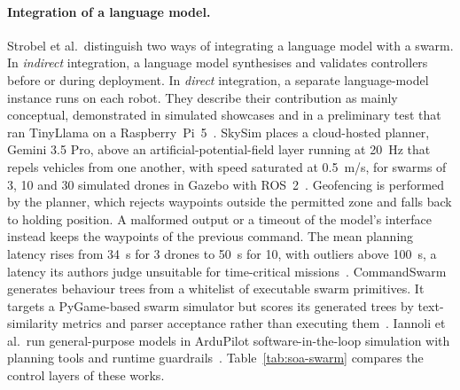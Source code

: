 \paragraph{Integration of a language model.} Strobel et al.\ distinguish two ways of integrating a
language model with a swarm. In \emph{indirect} integration, a language model synthesises and
validates controllers before or during deployment. In \emph{direct} integration, a separate
language-model instance runs on each robot. They describe their contribution as mainly conceptual,
demonstrated in simulated showcases and in a preliminary test that ran TinyLlama on a
Raspberry~Pi~5~\cite{llm2swarm2024}. SkySim places a cloud-hosted planner, Gemini 3.5 Pro, above an
artificial-potential-field layer running at 20~Hz that repels vehicles from one another, with speed
saturated at 0.5~m/s, for swarms of 3, 10 and 30 simulated drones in Gazebo with
ROS~2~\cite{skysim2026}. Geofencing is performed by the planner, which rejects waypoints outside the
permitted zone and falls back to holding position. A malformed output or a timeout of the model's
interface instead keeps the waypoints of the previous command. The mean planning latency rises from
34~s for 3 drones to 50~s for 10, with outliers above 100~s, a latency its authors judge unsuitable
for time-critical missions~\cite{skysim2026}. CommandSwarm generates behaviour trees from a
whitelist of executable swarm primitives. It targets a PyGame-based swarm simulator but scores its
generated trees by text-similarity metrics and parser acceptance rather than executing
them~\cite{commandswarm2026}. Iannoli et al.\ run general-purpose models in ArduPilot
software-in-the-loop simulation with planning tools and runtime guardrails~\cite{iannoli2026}.
Table~\ref{tab:soa-swarm} compares the control layers of these works.

